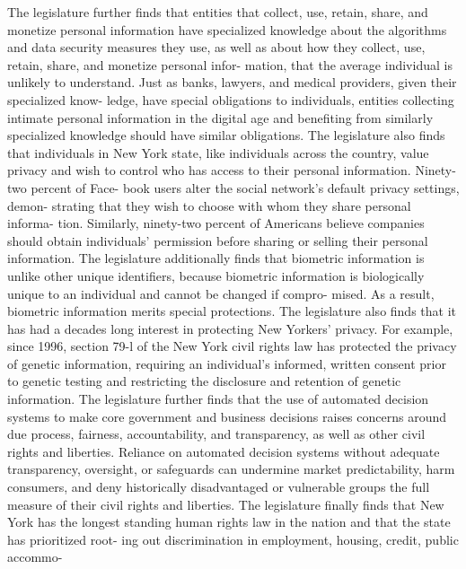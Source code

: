    The legislature further finds that entities that collect, use, retain,
 share, and monetize  personal  information  have  specialized  knowledge
 about  the  algorithms  and  data security measures they use, as well as
 about how they collect, use, retain, share, and monetize personal infor-
 mation,  that the average individual is unlikely to understand.  Just as
 banks, lawyers, and medical providers,  given  their  specialized  know-
 ledge,  have  special  obligations  to  individuals, entities collecting
 intimate personal information in the digital  age  and  benefiting  from
 similarly specialized knowledge should have similar obligations.
   The  legislature  also  finds that individuals in New York state, like
 individuals across the country, value privacy and wish  to  control  who
 has  access  to their personal information.  Ninety-two percent of Face-
 book users alter the social network's default privacy  settings,  demon-
 strating that they wish to choose with whom they share personal informa-
 tion.    Similarly,  ninety-two  percent  of Americans believe companies
 should obtain individuals' permission before sharing  or  selling  their
 personal information.
   The  legislature  additionally  finds  that  biometric  information is
 unlike  other  unique  identifiers,  because  biometric  information  is
 biologically  unique  to  an individual and cannot be changed if compro-
 mised. As a result, biometric information merits special protections.
   The legislature also finds that it has had a decades long interest  in
 protecting  New  Yorkers' privacy. For example, since 1996, section 79-l
 of the New York civil rights law has protected the  privacy  of  genetic
 information,  requiring  an individual's informed, written consent prior
 to genetic testing and  restricting  the  disclosure  and  retention  of
 genetic information.
   The  legislature  further  finds  that  the  use of automated decision
 systems to make core government and business decisions  raises  concerns
 around  due process, fairness, accountability, and transparency, as well
 as other civil rights and liberties.   Reliance  on  automated  decision
 systems  without  adequate  transparency,  oversight,  or safeguards can
 undermine market predictability, harm consumers, and  deny  historically
 disadvantaged  or  vulnerable  groups  the  full  measure of their civil
 rights and liberties.
   The legislature finally finds that New York has the  longest  standing
 human  rights law in the nation and that the state has prioritized root-
 ing out discrimination in employment, housing, credit,  public  accommo-
